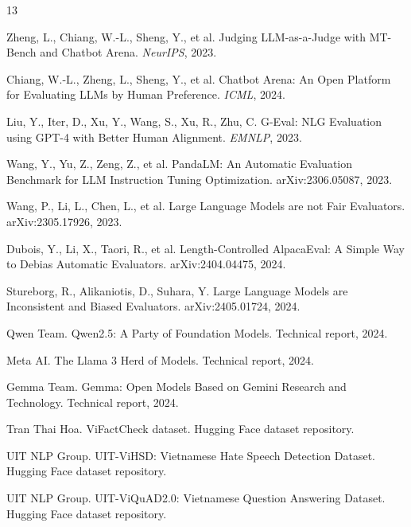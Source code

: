 \documentclass[pdflatex,sn-mathphys-num]{sn-jnl}
\begin{document}
\footnotesize
\begin{thebibliography}{13}
\setlength{\itemsep}{0pt}
\setlength{\parskip}{0pt}

Zheng, L., Chiang, W.-L., Sheng, Y., et al. Judging LLM-as-a-Judge with MT-Bench and Chatbot Arena. \textit{NeurIPS}, 2023.

Chiang, W.-L., Zheng, L., Sheng, Y., et al. Chatbot Arena: An Open Platform for Evaluating LLMs by Human Preference. \textit{ICML}, 2024.

Liu, Y., Iter, D., Xu, Y., Wang, S., Xu, R., Zhu, C. G-Eval: NLG Evaluation using GPT-4 with Better Human Alignment. \textit{EMNLP}, 2023.

Wang, Y., Yu, Z., Zeng, Z., et al. PandaLM: An Automatic Evaluation Benchmark for LLM Instruction Tuning Optimization. arXiv:2306.05087, 2023.

Wang, P., Li, L., Chen, L., et al. Large Language Models are not Fair Evaluators. arXiv:2305.17926, 2023.

Dubois, Y., Li, X., Taori, R., et al. Length-Controlled AlpacaEval: A Simple Way to Debias Automatic Evaluators. arXiv:2404.04475, 2024.

Stureborg, R., Alikaniotis, D., Suhara, Y. Large Language Models are Inconsistent and Biased Evaluators. arXiv:2405.01724, 2024.

Qwen Team. Qwen2.5: A Party of Foundation Models. Technical report, 2024.

Meta AI. The Llama 3 Herd of Models. Technical report, 2024.

Gemma Team. Gemma: Open Models Based on Gemini Research and Technology. Technical report, 2024.

Tran Thai Hoa. ViFactCheck dataset. Hugging Face dataset repository.

UIT NLP Group. UIT-ViHSD: Vietnamese Hate Speech Detection Dataset. Hugging Face dataset repository.

UIT NLP Group. UIT-ViQuAD2.0: Vietnamese Question Answering Dataset. Hugging Face dataset repository.

\end{thebibliography}
\normalsize

\clearpage
\appendix
\end{document}
